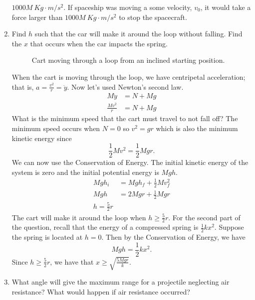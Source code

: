 \begin{enumerate}
  \(1000M \ Kg\cdot m/s^2\).
  If spaceship was moving a some velocity, \(v_0\), it would take a force larger
  than \(1000M \ Kg\cdot m/s^2\) to stop the spacecraft.
\item
  Find \(h\) such that the car will make it around the loop without falling.
  Find the \(x\) that occurs when the car impacts the spring.
  \begin{figure}[H]
    \centering
    \quad
    \caption{Cart moving through a loop from an inclined starting position.}
  \end{figure}
  When the cart is moving through the loop, we have centripetal acceleration;
  that is, \(a = \frac{v^2}{r} = \ddot{y}\).
  Now let's used Newton's second law.
  \begin{align*}
    M\ddot{y} &= N + Mg\\
    \frac{Mv^2}{r} &= N + Mg
  \end{align*}
  What is the minimum speed that the cart must travel to not fall off?
  The minimum speed occurs when \(N = 0\) so \(v^2 = gr\) which is also the
  minimum kinetic energy since
  \[
  \frac{1}{2}Mv^2 = \frac{1}{2}Mgr.
  \]
  We can now use the Conservation of Energy.
  The initial kinetic energy of the system is zero and the initial potential
  energy is \(Mgh\).
  \begin{align*}
    Mgh_i &= Mgh_f + \frac{1}{2}Mv_f^2\\
    Mgh &= 2Mgr + \frac{1}{2}Mgr\\
    h = \frac{5}{2}r
  \end{align*}
  The cart will make it around the loop when \(h\geq\frac{5}{2}r\).
  For the second part of the question, recall that the energy of a compressed
  spring is \(\frac{1}{2}kx^2\).
  Suppose the spring is located at \(h = 0\).
  Then by the Conservation of Energy, we have
  \[
  Mgh = \frac{1}{2}kx^2.
  \]
  Since \(h\geq\frac{5}{2}r\), we have that \(x\geq\sqrt{\frac{5Mgr}{k}}\).
\item
  What angle will give the maximum range for a projectile neglecting air
  resistance?
  What would happen if air resistance occurred?
  \begin{figure}[H]
    \centering

\end{figure}
\end{enumerate}
